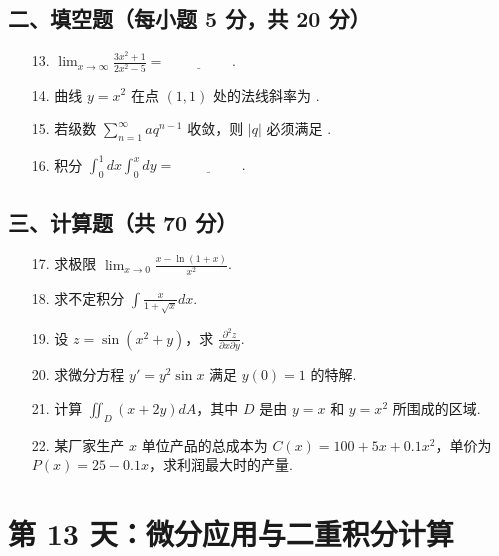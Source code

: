 \documentclass[11pt,a4paper]{article}
\begin{document}
\subsection*{二、填空题（每小题 5 分，共 20 分）}
\begin{enumerate}
    \item[13.] $\lim_{x \to \infty} \frac{3x^2+1}{2x^2-5} = \underline{\hspace{2cm}}$.
    \item[14.] 曲线 $y = x^2$ 在点 $(1, 1)$ 处的法线斜率为 \underline{\hspace{2cm}}.
    \item[15.] 若级数 $\sum_{n=1}^{\infty} aq^{n-1}$ 收敛，则 $|q|$ 必须满足 \underline{\hspace{2cm}}.
    \item[16.] 积分 $\int_0^1 dx \int_0^x dy = \underline{\hspace{2cm}}. $
\end{enumerate}
\subsection*{三、计算题（共 70 分）}
\begin{enumerate}
    \item[17.] 求极限 $\lim_{x \to 0} \frac{x - \ln(1+x)}{x^2}$.
    \item[18.] 求不定积分 $\int \frac{x}{1+\sqrt{x}} dx$.
    \item[19.] 设 $z = \sin(x^2+y)$，求 $\frac{\partial^2 z}{\partial x \partial y}$.
    \item[20.] 求微分方程 $y' = y^2 \sin x$ 满足 $y(0)=1$ 的特解.
    \item[21.] 计算 $\iint_D (x+2y) dA$，其中 $D$ 是由 $y=x$ 和 $y=x^2$ 所围成的区域.
    \item[22.] 某厂家生产 $x$ 单位产品的总成本为 $C(x) = 100+5x+0.1x^2$，单价为 $P(x)=25-0.1x$，求利润最大时的产量.
\end{enumerate}

\newpage

\section*{第 13 天：微分应用与二重积分计算}
\end{document}
